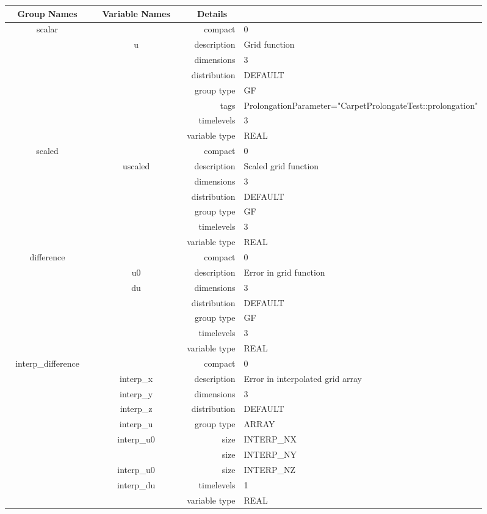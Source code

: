 \begin{tabular*}{150mm}{|c|c@{\extracolsep{\fill}}|rl|} \hline 
~ {\bf Group Names} ~ & ~ {\bf Variable Names} ~  &{\bf Details} ~ & ~\\ 
\hline 
scalar &  & compact & 0 \\ 
 & u & description & Grid function \\ 
 &  & dimensions & 3 \\ 
 &  & distribution & DEFAULT \\ 
 &  & group type & GF \\ 
 &  & tags & ProlongationParameter="CarpetProlongateTest::prolongation" \\ 
 &  & timelevels & 3 \\ 
 &  & variable type & REAL \\ 
\hline 
scaled &  & compact & 0 \\ 
 & uscaled & description & Scaled grid function \\ 
 &  & dimensions & 3 \\ 
 &  & distribution & DEFAULT \\ 
 &  & group type & GF \\ 
 &  & timelevels & 3 \\ 
 &  & variable type & REAL \\ 
\hline 
difference &  & compact & 0 \\ 
 & u0 & description & Error in grid function \\ 
 & du & dimensions & 3 \\ 
 &  & distribution & DEFAULT \\ 
 &  & group type & GF \\ 
 &  & timelevels & 3 \\ 
 &  & variable type & REAL \\ 
\hline 
interp\_difference &  & compact & 0 \\ 
 & interp\_x & description & Error in interpolated grid array \\ 
 & interp\_y & dimensions & 3 \\ 
 & interp\_z & distribution & DEFAULT \\ 
 & interp\_u & group type & ARRAY \\ 
 & interp\_u0 & size & INTERP\_NX \\ 
& ~ & size & INTERP\_NY \\ 
 & interp\_u0 & size & INTERP\_NZ \\ 
 & interp\_du & timelevels & 1 \\ 
 &  & variable type & REAL \\ 

\end{tabular*}
